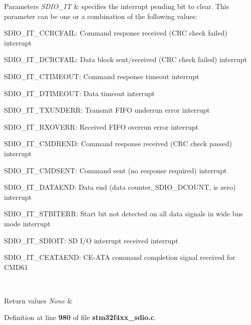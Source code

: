 \begin{DoxyParams}{Parameters}
{\em S\+D\+I\+O\+\_\+\+IT} & specifies the interrupt pending bit to clear. This parameter can be one or a combination of the following values\+: \begin{DoxyItemize}
\item S\+D\+I\+O\+\_\+\+I\+T\+\_\+\+C\+C\+R\+C\+F\+A\+IL\+: Command response received (C\+RC check failed) interrupt \item S\+D\+I\+O\+\_\+\+I\+T\+\_\+\+D\+C\+R\+C\+F\+A\+IL\+: Data block sent/received (C\+RC check failed) interrupt \item S\+D\+I\+O\+\_\+\+I\+T\+\_\+\+C\+T\+I\+M\+E\+O\+UT\+: Command response timeout interrupt \item S\+D\+I\+O\+\_\+\+I\+T\+\_\+\+D\+T\+I\+M\+E\+O\+UT\+: Data timeout interrupt \item S\+D\+I\+O\+\_\+\+I\+T\+\_\+\+T\+X\+U\+N\+D\+E\+RR\+: Transmit F\+I\+FO underrun error interrupt \item S\+D\+I\+O\+\_\+\+I\+T\+\_\+\+R\+X\+O\+V\+E\+RR\+: Received F\+I\+FO overrun error interrupt \item S\+D\+I\+O\+\_\+\+I\+T\+\_\+\+C\+M\+D\+R\+E\+ND\+: Command response received (C\+RC check passed) interrupt \item S\+D\+I\+O\+\_\+\+I\+T\+\_\+\+C\+M\+D\+S\+E\+NT\+: Command sent (no response required) interrupt \item S\+D\+I\+O\+\_\+\+I\+T\+\_\+\+D\+A\+T\+A\+E\+ND\+: Data end (data counter, S\+D\+I\+O\+\_\+\+D\+C\+O\+U\+NT, is zero) interrupt \item S\+D\+I\+O\+\_\+\+I\+T\+\_\+\+S\+T\+B\+I\+T\+E\+RR\+: Start bit not detected on all data signals in wide bus mode interrupt \item S\+D\+I\+O\+\_\+\+I\+T\+\_\+\+S\+D\+I\+O\+IT\+: SD I/O interrupt received interrupt \item S\+D\+I\+O\+\_\+\+I\+T\+\_\+\+C\+E\+A\+T\+A\+E\+ND\+: C\+E-\/\+A\+TA command completion signal received for C\+M\+D61 \end{DoxyItemize}
\\
\hline
\end{DoxyParams}

\begin{DoxyRetVals}{Return values}
{\em None} & \\
\hline
\end{DoxyRetVals}


Definition at line \textbf{ 980} of file \textbf{ stm32f4xx\+\_\+sdio.\+c}.



